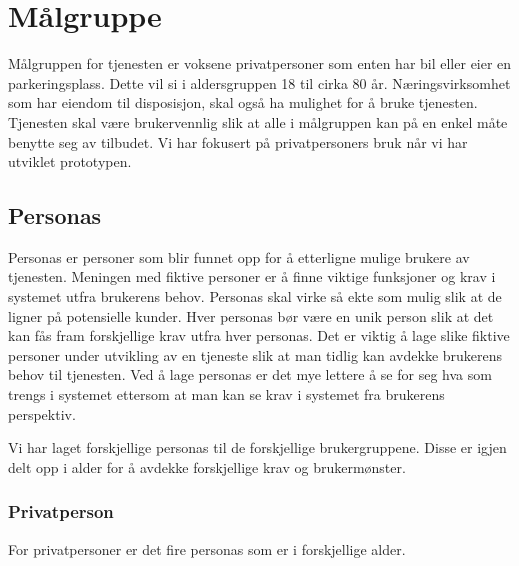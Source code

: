 
\section{Målgruppe}
Målgruppen for tjenesten er voksene privatpersoner som enten har bil eller eier en parkeringsplass. Dette vil si i aldersgruppen 18 til cirka 80 år. Næringsvirksomhet som har eiendom til disposisjon, skal også ha mulighet for å bruke tjenesten. Tjenesten skal være brukervennlig slik at alle i målgruppen kan på en enkel måte benytte seg av tilbudet. Vi har fokusert på privatpersoners bruk når vi har utviklet prototypen.



\subsection{Personas}
Personas er personer som blir funnet opp for å etterligne mulige brukere av tjenesten. Meningen med fiktive personer er å finne viktige funksjoner og krav i systemet utfra brukerens behov. Personas skal virke så ekte som mulig slik at de ligner på potensielle kunder. Hver personas bør være en unik person slik at det kan fås fram forskjellige krav utfra hver personas. Det er viktig å lage slike fiktive personer under utvikling av en tjeneste slik at man tidlig kan avdekke brukerens behov til tjenesten. Ved å lage personas er det mye lettere å se for seg hva som trengs i systemet ettersom at man kan se krav i systemet fra brukerens perspektiv.  



Vi har laget forskjellige personas til de forskjellige brukergruppene. Disse er igjen delt opp i alder for å avdekke forskjellige krav og brukermønster. 



\subsubsection{Privatperson}
For privatpersoner er det fire personas som er i forskjellige alder.


